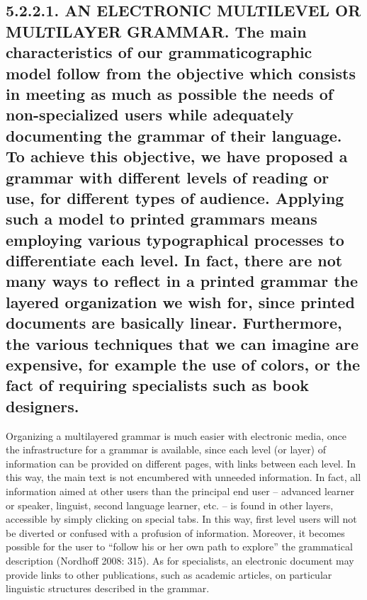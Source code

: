 \documentclass[letterpaper]{article}
\begin{document}
\subsection[5.2.2.1. AN ELECTRONIC MULTILEVEL OR MULTILAYER GRAMMAR. The main characteris\-tics of our grammaticographic model follow from the objective which consists in meeting as much as possible the needs of non{}-specialized users while adequately documenting the grammar of their language. To achieve this objective, we have proposed a grammar with different levels of reading or use, for different types of audience. Applying such a model to printed grammars means employing various typographical processes to differentiate each level. In fact, there are not many ways to reflect in a printed grammar the layered organization we wish for, since printed documents are basically linear. Furthermore, the various techniques that we can imagine are expensive, for example the use of colors, or the fact of requiring specialists such as book designers.]{5.2.2.1. AN ELECTRONIC MULTILEVEL OR MULTILAYER GRAMMAR. \textmd{The main characteris}\textmd{\-}\textmd{tics of our grammaticographic model follow from the objective which consists in meeting as much as possible }\textmd{the }\textmd{needs of }\textmd{non-}\textmd{specialized users while adequately documenting the grammar of their language}\textmd{.}\textmd{ }\textmd{T}\textmd{o achieve this objective, we }\textmd{have }\textmd{proposed a grammar with different levels of reading or use, for different types of audience. Applying such a model to printed grammars means employ}\textmd{ing}\textmd{ }\textmd{various }\textmd{typographical processes to differentiate each level. In fact, there are not many ways to reflect in a printed grammar the layered organization we}\textmd{ wish for}\textmd{, since printed document}\textmd{s}\textmd{ are basically linear. }\textmd{Furthermore, the various techniques that we c}\textmd{an}\textmd{ imagine are expensive, for example the use of colors, }\textmd{or the fact of}\textmd{ requiring specialists such as book designers.}}
Organizing a multilayered grammar is much easier with electronic media, once the infrastructure for a grammar is available, since each level (or layer) of information can be provided on different pages, with links between each level. In this way, the main text is not encumbered with unneeded information. In fact, all information aimed at other users than the principal end user {}-- advanced learner or speaker, linguist, second language learner, etc. -- is found in other layers, accessible by simply clicking on special tabs.  In this way, first level users will not be diverted or confused with a profusion of information. Moreover, it becomes possible for the user to {\textquotedblleft}follow his or her own path to explore{\textquotedblright} the grammatical description (Nordhoff 2008: 315). As for specialists, an electronic document may provide links to other publications, such as  academic articles, on particular linguistic structures described in the grammar.
\end{document}
